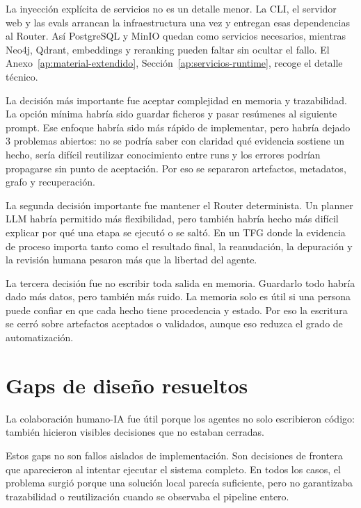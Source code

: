 La inyección explícita de servicios no es un detalle menor. La CLI, el servidor
web y las evals arrancan la infraestructura una vez y entregan esas
dependencias al Router. Así PostgreSQL y MinIO quedan como servicios necesarios,
mientras Neo4j, Qdrant, embeddings y reranking pueden faltar sin ocultar el
fallo. El Anexo~\ref{ap:material-extendido},
Sección~\ref{ap:servicios-runtime}, recoge el detalle técnico.

La decisión más importante fue aceptar complejidad en memoria y trazabilidad. La
opción mínima habría sido guardar ficheros y pasar resúmenes al siguiente
prompt. Ese enfoque habría sido más rápido de implementar, pero habría dejado 3
problemas abiertos: no se podría saber con claridad qué evidencia sostiene un
hecho, sería difícil reutilizar conocimiento entre runs y los errores podrían
propagarse sin punto de aceptación. Por eso se separaron artefactos, metadatos,
grafo y recuperación.

La segunda decisión importante fue mantener el Router determinista. Un planner
LLM habría permitido más flexibilidad, pero también habría hecho más difícil
explicar por qué una etapa se ejecutó o se saltó. En un TFG donde la evidencia
de proceso importa tanto como el resultado final, la reanudación, la depuración
y la revisión humana pesaron más que la libertad del agente.

La tercera decisión fue no escribir toda salida en memoria. Guardarlo todo
habría dado más datos, pero también más ruido. La memoria solo es útil si una
persona puede confiar en que cada hecho tiene procedencia y estado. Por eso la
escritura se cerró sobre artefactos aceptados o validados, aunque eso reduzca el
grado de automatización.

\section{Gaps de diseño resueltos}

La colaboración humano-IA fue útil porque los agentes no solo escribieron
código: también hicieron visibles decisiones que no estaban cerradas.

Estos gaps no son fallos aislados de implementación. Son decisiones de frontera
que aparecieron al intentar ejecutar el sistema completo. En todos los casos,
el problema surgió porque una solución local parecía suficiente, pero no
garantizaba trazabilidad o reutilización cuando se observaba el pipeline entero.

